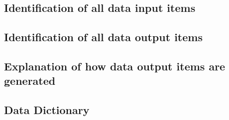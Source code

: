 \subsection{Identification of all data input items}

\subsection{Identification of all data output items}

\subsection{Explanation of how data output items are generated}

\subsection{Data Dictionary}

